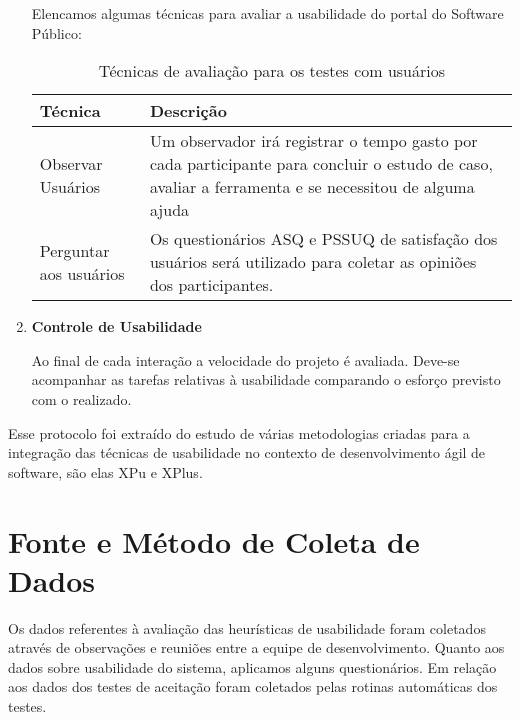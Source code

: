 \begin{enumerate}
	Elencamos algumas técnicas para avaliar a usabilidade do portal do Software Público:

	\begin{table}[h]
	\begin{tabular}{|l| p{10cm}	|}
		\hline
		Técnica & Descrição \\ \hline
		Observar Usuários & Um observador irá registrar o tempo 
		gasto por cada participante para concluir o estudo de caso, 
		avaliar a ferramenta e se necessitou de alguma ajuda    \\ \hline
		Perguntar aos usuários & Os questionários ASQ e PSSUQ 
		de satisfação dos usuários será utilizado 
		para coletar as opiniões dos participantes.\\ \hline
	\end{tabular}
	\caption{Técnicas de avaliação para os testes com usuários}
	\end{table}
	
	\item \textbf{Controle de Usabilidade}
	
	Ao final de cada interação a velocidade do projeto é avaliada. Deve-se acompanhar as tarefas relativas à usabilidade comparando o esforço previsto com o realizado.
	
\end{enumerate}

Esse protocolo foi extraído do estudo de várias metodologias criadas para a integração das técnicas de usabilidade no contexto de desenvolvimento ágil de software, são elas XPu e XPlus.
 
 


	

\section{Fonte e Método de Coleta de Dados}

Os dados referentes à avaliação das heurísticas de usabilidade foram coletados através de observações e reuniões entre a equipe de desenvolvimento. Quanto aos dados sobre usabilidade do sistema, aplicamos alguns questionários. Em relação aos dados dos testes de aceitação foram coletados pelas rotinas automáticas dos testes.

